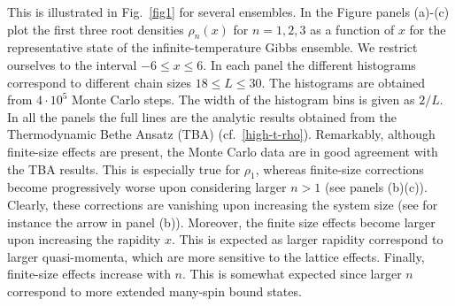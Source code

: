 \documentclass[twocolumn,superscriptaddress,prb,10pt]{revtex4-1}
\begin{document}
This is illustrated in Fig.~\ref{fig1} for several ensembles. In the Figure panels (a)-(c) 
plot the first three root densities $\rho_n(x)$ for $n=1,2,3$ as a function of $x$ for the 
representative state of the infinite-temperature Gibbs ensemble. We restrict ourselves to 
the interval $-6\le x\le 6$. In each panel the different histograms correspond to different 
chain sizes $18\le L\le 30$. The histograms are obtained from $4\cdot 10^5$ Monte Carlo 
steps. The width of the histogram bins is given as $2/L$. In all the panels the full lines 
are the analytic results obtained from the Thermodynamic Bethe Ansatz (TBA) 
(cf.~\eqref{high-t-rho}). Remarkably, although finite-size effects are present, the 
Monte Carlo data are in good agreement with the TBA results. This is especially true for 
$\rho_1$, whereas finite-size corrections become progressively worse upon considering 
larger $n>1$ (see panels (b)(c)). Clearly, these corrections are vanishing upon increasing 
the system size (see for instance the arrow in panel (b)). Moreover, the finite size effects 
become larger upon increasing the rapidity $x$. This is expected as larger rapidity 
correspond to larger quasi-momenta, which are more sensitive to the lattice effects. 
Finally, finite-size effects increase with $n$. This is somewhat expected since larger $n$ 
correspond to more extended many-spin bound states. 
\end{document}
